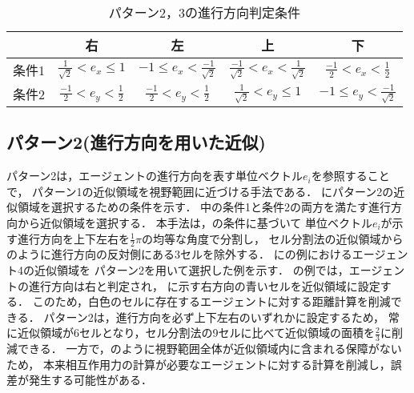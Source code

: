 
\begin{table}[t]
	\centering
	\caption{パターン2，3の進行方向判定条件}
	\label{tb:patan2_joken}
	\begin{tabular}{c|cccc}
		\hline \hline
		& 右 & 左 & 上 & 下  \\ \hline
		条件1
		& $\frac{1}{\sqrt{2}} < e_x \leq 1$
		& $ -1 \leq e_x < \frac{-1}{\sqrt{2}}$
		& $ \frac{-1}{\sqrt{2}} < e_x < \frac{1}{\sqrt{2}}$
		& $ \frac{-1}{2} < e_x < \frac{1}{2} $ \\ \hline
		条件2 
		& $\frac{-1}{2} < e_y < \frac{1}{2} $ 
		& $\frac{-1}{2} < e_y < \frac{1}{2} $
  	& $ \frac{1}{\sqrt{2}} < e_y \leq 1$
		& $ -1 \leq e_y < \frac{-1}{\sqrt{2}} $ \\ \hline
	\end{tabular}
\end{table}

\subsection{パターン2(進行方向を用いた近似)}
パターン2は，エージェントの進行方向を表す単位ベクトル$e_{i}$を参照することで，
パターン1の近似領域を視野範囲に近づける手法である\cite{katayose}．
にパターン2の近似領域を選択するための条件を示す．
中の条件1と条件2の両方を満たす進行方向から近似領域を選択する．
本手法は，の条件に基づいて
単位ベクトル$e_{i}$が示す進行方向を上下左右を$\frac{1}{2}\pi$の均等な角度で分割し，
セル分割法の近似領域からのように進行方向の反対側にある3セルを除外する．
にの例におけるエージェント4の近似領域を
パターン2を用いて選択した例を示す．
の例では，エージェントの進行方向は右と判定され，
に示す右方向の青いセルを近似領域に設定する．
このため，白色のセルに存在するエージェントに対する距離計算を削減できる．
パターン2は，進行方向を必ず上下左右のいずれかに設定するため，
常に近似領域が6セルとなり，セル分割法の9セルに比べて近似領域の面積を$\frac{2}{3}$に削減できる．
一方で，のように視野範囲全体が近似領域内に含まれる保障がないため，
本来相互作用力の計算が必要なエージェントに対する計算を削減し，誤差が発生する可能性がある．


